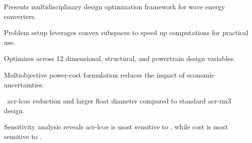 \item Presents multidisciplinary design optimization framework for wave energy converters.
\item Problem setup leverages convex subspaces to speed up computations for practical use.
\item Optimizes across 12 dimensional, structural, and powertrain design variables.
\item Multiobjective power-cost formulation reduces the impact of economic uncertainties.
\item \resultsRE[pctImproveLCOEMinLCOE]~\gls{acr-lcoe} reduction and larger float diameter compared to standard \gls{acr-rm3} design.
\ifdefined\DISSERTATION
    \item Sensitivity analysis reveals \gls{acr-lcoe} is most sensitive to \resultsRE[sensitiveParamCategoriesMinLCOE], while cost is most sensitive to \resultsRE[sensitiveParamCategoriesMinCapex].
\fi
